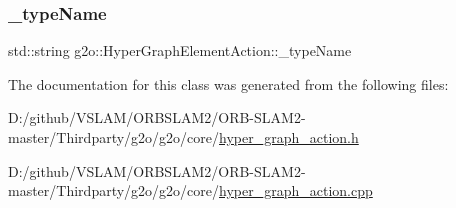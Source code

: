 \mbox{\label{classg2o_1_1_hyper_graph_element_action_ae05082e218d213f8db5de7a79769f97c}} 
\subsubsection{\texorpdfstring{\+\_\+type\+Name}{\_typeName}}
{\footnotesize\ttfamily std\+::string g2o\+::\+Hyper\+Graph\+Element\+Action\+::\+\_\+type\+Name\hspace{0.3cm}{\ttfamily [protected]}}



The documentation for this class was generated from the following files\+:\begin{DoxyCompactItemize}
\item 
D\+:/github/\+V\+S\+L\+A\+M/\+O\+R\+B\+S\+L\+A\+M2/\+O\+R\+B-\/\+S\+L\+A\+M2-\/master/\+Thirdparty/g2o/g2o/core/\mbox{\hyperlink{hyper__graph__action_8h}{hyper\+\_\+graph\+\_\+action.\+h}}\item 
D\+:/github/\+V\+S\+L\+A\+M/\+O\+R\+B\+S\+L\+A\+M2/\+O\+R\+B-\/\+S\+L\+A\+M2-\/master/\+Thirdparty/g2o/g2o/core/\mbox{\hyperlink{hyper__graph__action_8cpp}{hyper\+\_\+graph\+\_\+action.\+cpp}}\end{DoxyCompactItemize}
